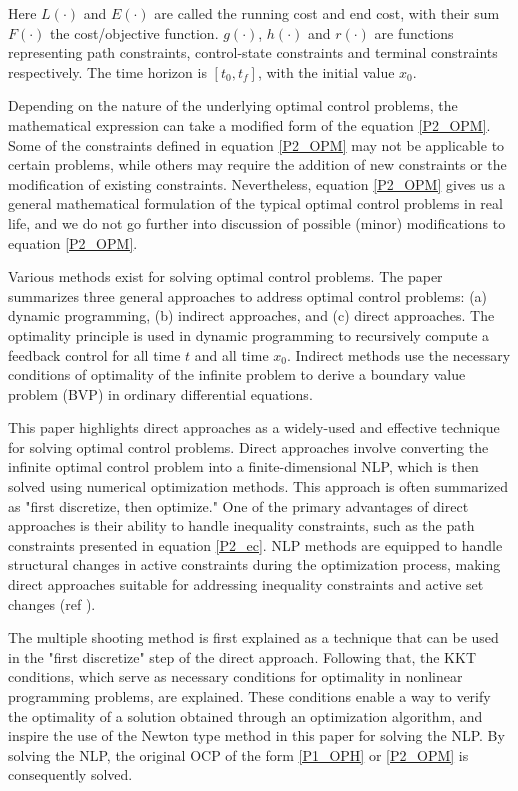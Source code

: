 \documentclass  [
  paper    = a4,
  BCOR     = 10mm,
  twoside,
  fontsize = 12pt,
  fleqn,
  toc      = bibnumbered,
  toc      = listofnumbered,
  numbers  = noendperiod,
  headings = normal,
  listof   = leveldown,
  version  = 3.03
]                                       {scrreprt}
\newcommand{\<}{\langle}
\renewcommand{\>}{\rangle}
\begin{document}
Here $L(\cdot)$ and $E(\cdot)$ are called the running cost and end cost, with their sum $F(\cdot)$ the cost/objective function. $g(\cdot)$, $h(\cdot)$ and $r(\cdot)$ are functions representing path constraints, control-state constraints and terminal constraints respectively. The time horizon is $[t_0, t_f]$, with the initial value $x_0$.   

Depending on the nature of the underlying optimal control problems, the mathematical expression can take a modified form of the equation \ref{P2_OPM}. Some of the constraints defined in equation \ref{P2_OPM} may not be applicable to certain problems, while others may require the addition of new constraints or the modification of existing constraints. Nevertheless, equation \ref{P2_OPM} gives us a general mathematical formulation of the typical optimal control problems in real life, and we do not go further into discussion of possible (minor) modifications to equation \ref{P2_OPM}. 

Various methods exist for solving optimal control problems. The paper \cite{MHHP05} summarizes three general approaches to address optimal control problems: (a) dynamic programming, (b) indirect approaches, and (c) direct approaches. The optimality principle is used in dynamic programming to recursively compute a feedback control for all time $t$ and all time $x_0$. Indirect methods use the necessary conditions of optimality of the infinite problem to derive a boundary value problem (BVP) in ordinary differential equations.


This paper highlights direct approaches as a widely-used and effective technique for solving optimal control problems. Direct approaches involve converting the infinite optimal control problem into a finite-dimensional NLP, which is then solved using numerical optimization methods. This approach is often summarized as "first discretize, then optimize." One of the primary advantages of direct approaches is their ability to handle inequality constraints, such as the path constraints presented in equation \ref{P2_ec}. NLP methods are equipped to handle structural changes in active constraints during the optimization process, making direct approaches suitable for addressing inequality constraints and active set changes (ref \cite{MHHP05}).

The multiple shooting method is first explained as a technique that can be used in the "first discretize" step of the direct approach. Following that, the KKT conditions, which serve as necessary conditions for optimality in nonlinear programming problems, are explained. These conditions enable a way to verify the optimality of a solution obtained through an optimization algorithm, and inspire the use of the Newton type method in this paper for solving the NLP. By solving the NLP, the original OCP of the form \ref{P1_OPH} or \ref{P2_OPM} is consequently solved.
\end{document}
